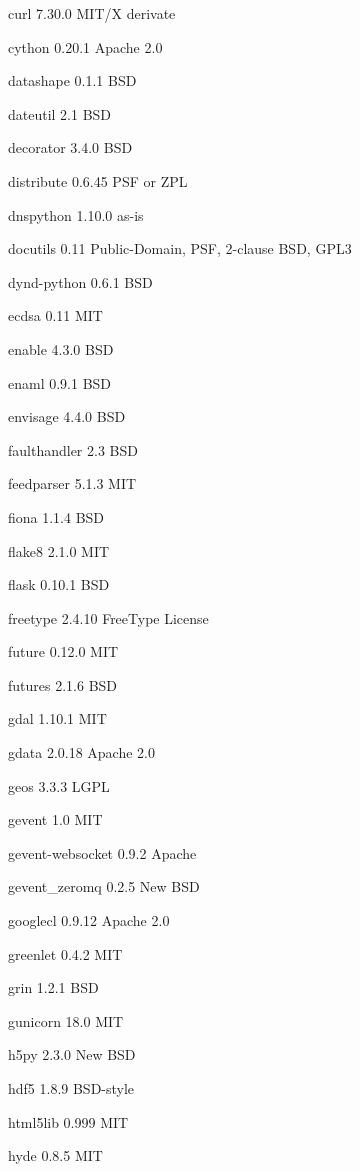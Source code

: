 \documentclass[letterpaper,10pt,openany,oneside]{sphinxmanual}
\begin{document}
\begin{DUlineblock}{0em}
\item[] curl  7.30.0  MIT/X derivate
\item[] cython        0.20.1  Apache 2.0
\item[] datashape     0.1.1   BSD
\item[] dateutil      2.1     BSD
\item[] decorator     3.4.0   BSD
\item[] distribute    0.6.45  PSF or ZPL
\item[] dnspython     1.10.0  as-is
\item[] docutils      0.11    Public-Domain, PSF, 2-clause BSD, GPL3
\item[] dynd-python   0.6.1   BSD
\item[] ecdsa         0.11    MIT
\item[] enable        4.3.0   BSD
\item[] enaml         0.9.1   BSD
\item[] envisage      4.4.0   BSD
\item[] faulthandler  2.3     BSD
\item[] feedparser    5.1.3   MIT
\item[] fiona         1.1.4   BSD
\item[] flake8        2.1.0   MIT
\item[] flask         0.10.1  BSD
\item[] freetype      2.4.10  FreeType License
\item[] future        0.12.0  MIT
\item[] futures       2.1.6   BSD
\item[] gdal  1.10.1  MIT
\item[] gdata         2.0.18  Apache 2.0
\item[] geos  3.3.3   LGPL
\item[] gevent        1.0     MIT
\item[] gevent-websocket      0.9.2   Apache
\item[] gevent\_zeromq         0.2.5   New BSD
\item[] googlecl      0.9.12  Apache 2.0
\item[] greenlet      0.4.2   MIT
\item[] grin  1.2.1   BSD
\item[] gunicorn      18.0    MIT
\item[] h5py  2.3.0   New BSD
\item[] hdf5  1.8.9   BSD-style
\item[] html5lib      0.999   MIT
\item[] hyde  0.8.5   MIT

\end{DUlineblock}
\end{document}
